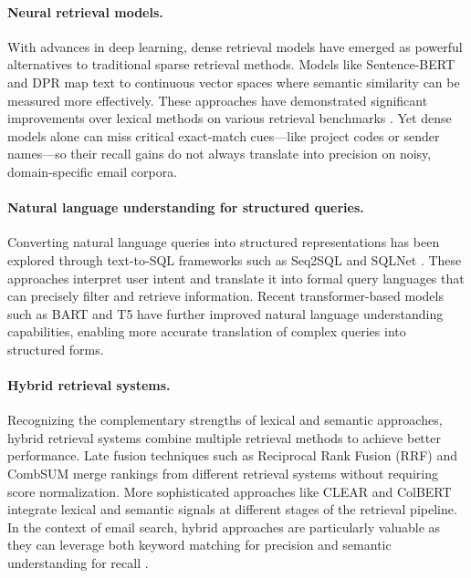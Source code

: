 \documentclass{article}
\begin{document}
\paragraph{Neural retrieval models.} 
With advances in deep learning, dense retrieval models have emerged as powerful alternatives to traditional sparse retrieval methods. Models like Sentence-BERT \citep{reimers2019sentence} and DPR \citep{karpukhin2020dense} map text to continuous vector spaces where semantic similarity can be measured more effectively. These approaches have demonstrated significant improvements over lexical methods on various retrieval benchmarks \citep{thakur2021beir, muennighoff2023mtebmassivetextembedding}. Yet dense models alone can miss critical exact‑match cues—like project codes or sender names—so their recall gains do not always translate into precision on noisy, domain‑specific email corpora.


\paragraph{Natural language understanding for structured queries.} 
Converting natural language queries into structured representations has been explored through text-to-SQL frameworks such as Seq2SQL \citep{zhong2017seq2sql} and SQLNet \citep{xu2017sqlnet}. These approaches interpret user intent and translate it into formal query languages that can precisely filter and retrieve information. Recent transformer-based models such as BART \citep{lewis2020bart} and T5 \citep{raffel2020exploring} have further improved natural language understanding capabilities, enabling more accurate translation of complex queries into structured forms. 

\paragraph{Hybrid retrieval systems.} 
Recognizing the complementary strengths of lexical and semantic approaches, hybrid retrieval systems combine multiple retrieval methods to achieve better performance. Late fusion techniques such as Reciprocal Rank Fusion (RRF) \citep{cormack2009reciprocal} and CombSUM \citep{fox1993combination} merge rankings from different retrieval systems without requiring score normalization. More sophisticated approaches like CLEAR \citep{gao2021complement} and ColBERT \citep{khattab2020colbert} integrate lexical and semantic signals at different stages of the retrieval pipeline. In the context of email search, hybrid approaches are particularly valuable as they can leverage both keyword matching for precision and semantic understanding for recall \citep{yang2019critically}.
\end{document}
